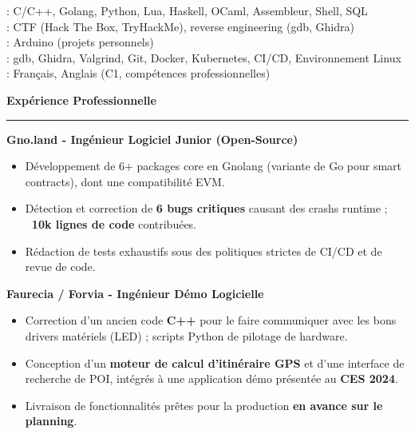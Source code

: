 \documentclass[9pt]{extarticle}
\begin{document}
\hspace*{5pt}{\bfseries Maîtrise}: C/C++, Golang, Python, Lua, Haskell, OCaml, Assembleur, Shell, SQL
\\
\hspace*{5pt}{\bfseries Sécurité}: CTF (Hack The Box, TryHackMe), reverse engineering (gdb, Ghidra)
\\
\hspace*{5pt}{\bfseries Notions}: Arduino (projets personnels)
\\
\hspace*{5pt}{\bfseries Outils}: gdb, Ghidra, Valgrind, Git, Docker, Kubernetes, CI/CD, Environnement Linux
\\
\hspace*{5pt}{\bfseries Langues}: Français, Anglais (C1, compétences professionnelles)

\par\vspace{5pt}

{\large\bfseries Expérience Professionnelle}
\par\vspace{-8pt}
\rule{\linewidth}{0.4pt}
\par\vspace{5pt}

{\bfseries Gno.land - Ingénieur Logiciel Junior (Open-Source)}
\begin{itemize}[noitemsep, topsep=0pt]
	\item Développement de 6+ packages core en Gnolang (variante de Go pour smart contracts), dont une compatibilité EVM.
	\item Détection et correction de {\bfseries 6 bugs critiques} causant des crashs runtime ; {\bfseries ~10k lignes de code} contribuées.
	\item Rédaction de tests exhaustifs sous des politiques strictes de CI/CD et de revue de code.
\end{itemize}

\par\vspace{5pt}

{\bfseries Faurecia / Forvia - Ingénieur Démo Logicielle}
\begin{itemize}[noitemsep, topsep=0pt]
	\item Correction d'un ancien code {\bfseries C++} pour le faire communiquer avec les bons drivers matériels (LED) ; scripts Python de pilotage de hardware.
	\item Conception d'un {\bfseries moteur de calcul d'itinéraire GPS} et d'une interface de recherche de POI, intégrés à une application démo présentée au {\bfseries CES 2024}.
	\item Livraison de fonctionnalités prêtes pour la production {\bfseries en avance sur le planning}.
\end{itemize}
\end{document}
